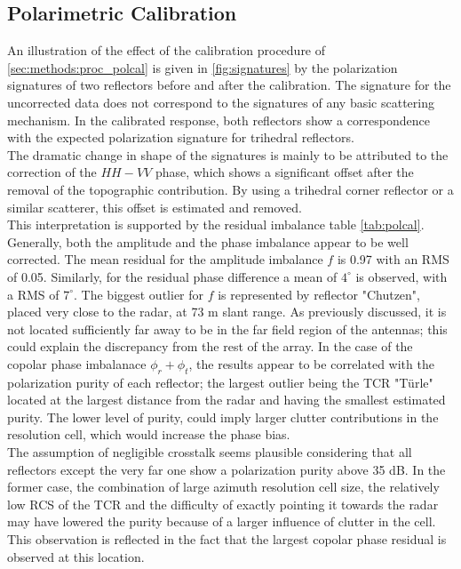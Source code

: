 \subsection{Polarimetric Calibration}
An illustration of the effect of the calibration procedure of \autoref{sec:methods:proc_polcal} is given in  \autoref{fig:signatures} by the polarization signatures of two reflectors before and after the calibration.
The signature for the uncorrected data does not correspond to the signatures of any basic scattering mechanism. In the calibrated response, both reflectors show a correspondence with the expected polarization signature for trihedral reflectors.\\ The dramatic change in shape of the signatures is mainly to be attributed to the correction of the $HH-VV$ phase, which shows a significant offset after the removal of the topographic contribution. By using a trihedral corner reflector or a similar scatterer, this offset is estimated and removed.\\
This interpretation is supported by the residual imbalance table \autoref{tab:polcal}.
Generally, both the amplitude and the phase imbalance appear to be well corrected. The mean residual for the amplitude imbalance $f$ is 0.97 with an RMS of 0.05. Similarly, for the residual phase difference a mean of $4^\circ$ is observed, with a RMS of $7^\circ$. The biggest outlier for $f$ is represented by reflector "Chutzen", placed very close to the radar, at 73 m slant range. As previously discussed, it is not located sufficiently far away to be in the far field region of the antennas; this could explain the discrepancy from the rest of the array. In the case of the copolar phase imbalanace $\phi_r + \phi_t$, the results appear to be correlated with the polarization purity of each reflector; the largest outlier being the TCR "T\"{u}rle" located at the largest distance from the radar and having the smallest estimated purity. The lower level of purity, could imply larger clutter contributions in the resolution cell, which would increase the phase bias.\\
The assumption of negligible crosstalk seems plausible considering that all reflectors  except the very far one show a polarization purity above 35 dB. In the former case, the combination of large azimuth resolution cell size, the relatively low RCS of the TCR and  the difficulty of exactly pointing it towards the radar may have lowered the purity because of a larger influence of clutter in the cell. This observation is reflected in the fact that the largest copolar phase residual is observed at this location.\\
